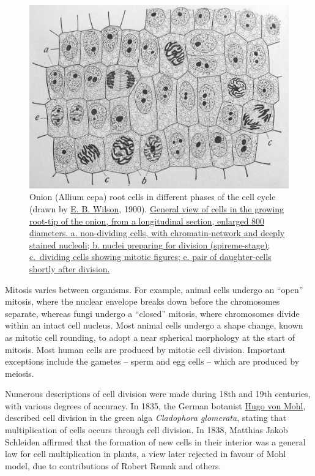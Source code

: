 \begin{figure}

{\centering \includegraphics[width=0.7\linewidth]{./figures/reproduction/Wilson1900Fig2} 

}

\caption{Onion (Allium cepa) root cells in different phases of the cell cycle (drawn by \href{https://en.wikipedia.org/wiki/Edmund_Beecher_Wilson}{E. B. Wilson}, 1900). \href{https://commons.wikimedia.org/wiki/File:Wilson1900Fig2.jpg}{General view of cells in the growing root-tip of the onion, from a longitudinal section, enlarged 800 diameters. a. non-dividing cells, with chromatin-network and deeply stained nucleoli; b. nuclei preparing for division (spireme-stage); c.~dividing cells showing mitotic figures; e. pair of daughter-cells shortly after division.}}\label{fig:onionroot}
\end{figure}

Mitosis varies between organisms. For example, animal cells undergo an ``open'' mitosis, where the nuclear envelope breaks down before the chromosomes separate, whereas fungi undergo a ``closed'' mitosis, where chromosomes divide within an intact cell nucleus. Most animal cells undergo a shape change, known as mitotic cell rounding, to adopt a near spherical morphology at the start of mitosis. Most human cells are produced by mitotic cell division. Important exceptions include the gametes -- sperm and egg cells -- which are produced by meiosis.

Numerous descriptions of cell division were made during 18th and 19th centuries, with various degrees of accuracy. In 1835, the German botanist \href{https://en.wikipedia.org/wiki/Hugo_von_Mohl}{Hugo von Mohl}, described cell division in the green alga \emph{Cladophora glomerata}, stating that multiplication of cells occurs through cell division. In 1838, Matthias Jakob Schleiden affirmed that the formation of new cells in their interior was a general law for cell multiplication in plants, a view later rejected in favour of Mohl model, due to contributions of Robert Remak and others.

